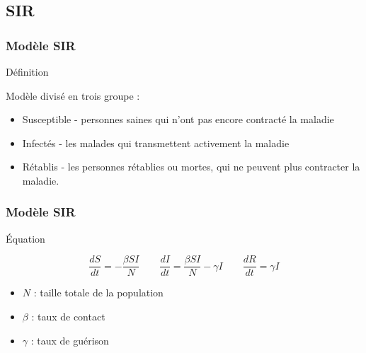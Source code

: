 \subsection{SIR}

\begin{frame}
        \frametitle{Modèle SIR}

        \begin{block}{Définition}

                Modèle divisé en trois groupe :
                \begin{itemize}
                        \item Susceptible - personnes saines qui n'ont pas encore contracté la maladie
                        \item Infectés - les malades qui transmettent activement la maladie
                        \item Rétablis - les personnes rétablies ou mortes, qui ne peuvent plus contracter la maladie.
                \end{itemize}

        \end{block}
\end{frame}

\begin{frame}
        \frametitle{Modèle SIR}

        \begin{alertblock}{Équation}

                $$ \frac{dS}{dt} = -\frac{\beta SI}{N} \qquad \frac{dI}{dt} = \frac{\beta SI}{N} - \gamma I \qquad \frac{dR}{dt} = \gamma I $$

                \begin{itemize}
                        \item $N$ : taille totale de la population
                        \item $\beta$ : taux de contact
                        \item $\gamma$ : taux de guérison
                \end{itemize}

        \end{alertblock}
\end{frame}

